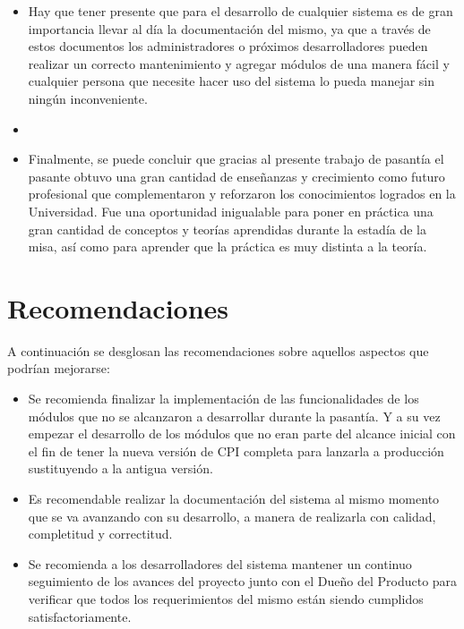 \begin{itemize}
	\item Hay que tener presente que para el desarrollo de cualquier sistema es de gran importancia llevar al día la documentación del mismo, ya que a través de estos documentos los administradores o próximos desarrolladores pueden realizar un correcto mantenimiento y agregar módulos de una manera fácil y cualquier persona que necesite hacer uso del sistema lo pueda manejar sin ningún inconveniente.
	\item \item Finalmente, se puede concluir que gracias al presente trabajo de pasantía el pasante obtuvo una gran cantidad de enseñanzas y crecimiento como futuro profesional que complementaron y reforzaron los conocimientos logrados en la Universidad. Fue una oportunidad inigualable para poner en práctica una gran cantidad de conceptos y teorías aprendidas durante la estadía de la misa, así como para aprender que la práctica es muy distinta a la teoría.
\end{itemize}

\section{Recomendaciones}
A continuación se desglosan las recomendaciones sobre aquellos aspectos que podrían mejorarse:
\begin{itemize}
	\item Se recomienda finalizar la implementación de las funcionalidades de los módulos que no se alcanzaron a desarrollar durante la pasantía. Y a su vez empezar el desarrollo de los módulos que no eran parte del alcance inicial con el fin de tener la nueva versión de CPI completa para lanzarla a producción sustituyendo a la antigua versión.
 	\item Es recomendable realizar la documentación del sistema al mismo momento que se va avanzando con su desarrollo, a manera de realizarla con calidad, completitud y correctitud.
	\item Se recomienda a los desarrolladores del sistema mantener un continuo seguimiento de los avances del proyecto junto con el Dueño del Producto para verificar que todos los requerimientos del mismo están siendo cumplidos satisfactoriamente.
\end{itemize}
